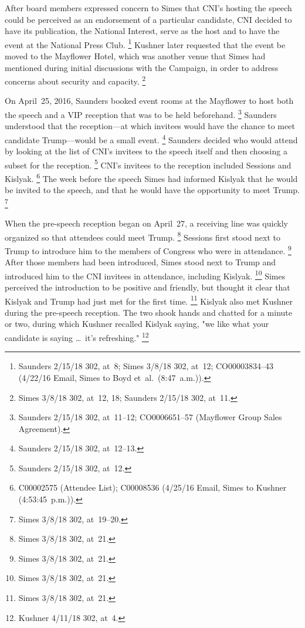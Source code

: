 After board members expressed concern to Simes that CNI's hosting the speech could be perceived as an endorsement of a particular candidate, CNI decided to have its publication, the National Interest, serve as the host and to have the event at the National Press Club.%
\footnote{Saunders 2/15/18 302, at~8;
Simes 3/8/18 302, at~12;
CO00003834--43 (4/22/16 Email, Simes to Boyd et~al.\ (8:47~a.m.)).}
Kushner later requested that the event be moved to the Mayflower Hotel, which was another venue that Simes had mentioned during initial discussions with the Campaign, in order to address concerns about security and capacity.%
\footnote{Simes 3/8/18 302, at~12, 18;
Saunders 2/15/18 302, at~11.}

On April~25, 2016, Saunders booked event rooms at the Mayflower to host both the speech and a VIP reception that was to be held beforehand.%
\footnote{Saunders 2/15/18 302, at~11--12;
CO0006651--57 (Mayflower Group Sales Agreement).}
Saunders understood that the reception---at which invitees would have the chance to meet candidate Trump---would be a small event.%
\footnote{Saunders 2/15/18 302, at~12--13.}
Saunders decided who would attend by looking at the list of CNI's invitees to the speech itself and then choosing a subset for the reception.%
\footnote{Saunders 2/15/18 302, at~12.}
CNI's invitees to the reception included Sessions and Kislyak.%
\footnote{C00002575 (Attendee List);
C00008536 (4/25/16 Email, Simes to Kushner (4:53:45~p.m.)).}
The week before the speech Simes had informed Kislyak that he would be invited to the speech, and that he would have the opportunity to meet Trump.%
\footnote{Simes 3/8/18 302, at~19--20.}

When the pre-speech reception began on April~27, a receiving line was quickly organized so that attendees could meet Trump.%
\footnote{Simes 3/8/18 302, at~21.}
Sessions first stood next to Trump to introduce him to the members of Congress who were in attendance.%
\footnote{Simes 3/8/18 302, at~21.}
After those members had been introduced, Simes stood next to Trump and introduced him to the CNI invitees in attendance, including Kislyak.%
\footnote{Simes 3/8/18 302, at~21.}
Simes perceived the introduction to be positive and friendly, but thought it clear that Kislyak and Trump had just met for the first time.%
\footnote{Simes 3/8/18 302, at~21.}
Kislyak also met Kushner during the pre-speech reception.
The two shook hands and chatted for a minute or two, during which Kushner recalled Kislyak saying, "we like what your candidate is saying \dots\ it's refreshing."%
\footnote{Kushner 4/11/18 302, at~4.}


